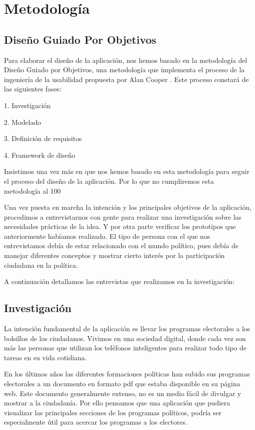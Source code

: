 \newpage
\thispagestyle{sectioned}
\chapter{Metodología}

\section{Diseño Guiado Por Objetivos}

Para elaborar el diseño de la aplicación, nos hemos basado en la metodología del Diseño Guiado por Objetivos, una metodología que implementa el proceso de la ingeniería de la usabilidad propuesta por Alan Cooper \cite{ref:bookAlanCooper}. Este proceso constará de las siguientes fases:

1. Investigación

2. Modelado

3. Definición de requisitos

4. Framework de diseño

Insistimos una vez más en que nos hemos basado en esta metodología para seguir el proceso del diseño de la aplicación. Por lo que no cumpliremos esta metodología al 100%

Una vez puesta en marcha la intención y los principales objetivos de la aplicación, procedimos a entrevistarnos con gente para realizar una investigación sobre las necesidades prácticas de la idea. Y por otra parte verificar los prototipos que anteriormente habíamos realizado. El tipo de persona con el que nos entrevistamos debía de estar relacionado con el mundo político, pues debía de manejar diferentes conceptos y mostrar cierto interés por la participación ciudadana en la política.

A continuación detallamos las entrevistas que realizamos en la investigación:

\section{Investigación}
La intención fundamental de la aplicación es llevar los programas electorales a los bolsillos de los ciudadanos. Vivimos en una sociedad digital, donde cada vez son más las personas que utilizan los teléfonos inteligentes para realizar todo tipo de tareas en su vida cotidiana.

En los últimos años las diferentes formaciones políticas han subido sus programas electorales a un documento en formato pdf que estaba disponible en su página web. Este documento generalmente extenso, no es un medio fácil de divulgar y mostrar a la ciudadanía. Por ello pensamos que una aplicación que pudiera visualizar las principales secciones de los programas políticos, podría ser especialmente útil para acercar los programas a los electores.

